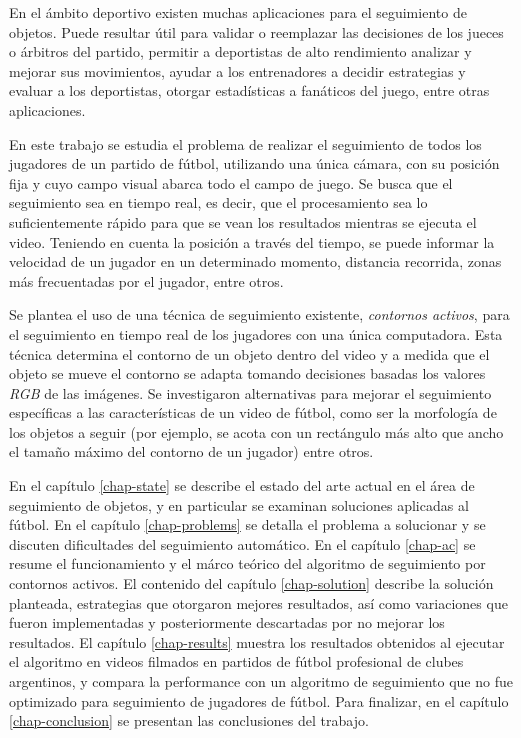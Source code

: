 \documentclass[a4paper,11pt]{report}
\begin{document}
En el ámbito deportivo existen muchas aplicaciones para el seguimiento de
objetos. Puede resultar útil para validar o reemplazar las decisiones de los
jueces o árbitros del partido, permitir a deportistas de alto rendimiento
analizar y mejorar sus movimientos, ayudar a los entrenadores a decidir
estrategias y evaluar a los deportistas, otorgar estadísticas a fanáticos del
juego, entre otras aplicaciones.

En este trabajo se estudia el problema de realizar el seguimiento de todos los
jugadores de un partido de fútbol, utilizando una única cámara, con su posición
fija y cuyo campo visual abarca todo el campo de juego. Se busca que el seguimiento sea en
tiempo real, es decir, que el procesamiento sea lo suficientemente rápido para
que se vean los resultados mientras se ejecuta el video. Teniendo en cuenta la posición
a través del tiempo, se puede informar la velocidad de un jugador en un
determinado momento, distancia recorrida, zonas más frecuentadas por el
jugador, entre otros.

Se plantea el uso de una técnica de seguimiento existente, \textit{contornos
activos}, para el seguimiento en tiempo real de los jugadores con una única
computadora. Esta técnica determina el contorno de un objeto dentro del video y
a medida que el objeto se mueve el contorno se adapta tomando decisiones
basadas los valores \textit{RGB} de las imágenes. Se investigaron alternativas
para mejorar el seguimiento específicas a las características de un video de
fútbol, como ser la morfología de los objetos a seguir (por ejemplo, se acota
con un rectángulo más alto que ancho el tamaño máximo del contorno de un
jugador) entre otros.

En el capítulo \ref{chap-state} se describe el estado del arte actual en el
área de seguimiento de objetos, y en particular se examinan soluciones
aplicadas al fútbol. En el capítulo \ref{chap-problems} se detalla el problema
a solucionar y se discuten dificultades del seguimiento automático. En el
capítulo \ref{chap-ac} se resume el funcionamiento y el márco teórico del
algoritmo de seguimiento por contornos activos. El contenido del capítulo
\ref{chap-solution} describe la solución planteada, estrategias que otorgaron
mejores resultados, así como variaciones que fueron implementadas y
posteriormente descartadas por no mejorar los resultados. El capítulo
\ref{chap-results} muestra los resultados obtenidos al ejecutar el algoritmo en
videos filmados en partidos de fútbol profesional de clubes argentinos, y
compara la performance con un algoritmo de seguimiento que no fue optimizado
para seguimiento de jugadores de fútbol. Para finalizar, en el capítulo
\ref{chap-conclusion} se presentan las conclusiones del trabajo.
\end{document}
